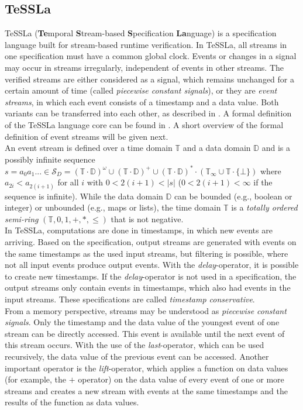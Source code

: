 	\subsection{TeSSLa}
		TeSSLa (\textbf{Te}mporal \textbf{S}tream-based \textbf{S}pecification \textbf{La}nguage) \cite{TeSSLa1} is a specification language built for stream-based runtime verification. In TeSSLa, all streams in one specification must have a common global clock. Events or changes in a signal may occur in streams irregularly, independent of events in other streams. The verified streams are either considered as a signal, which remains unchanged for a certain amount of time (called \textit{piecewise constant signals}), or they are \textit{event streams}, in which each event consists of a timestamp and a data value. Both variants can be transferred into each other, as described in \cite{TeSSLa1}. A formal definition of the TeSSLa language core can be found in \cite{TeSSLa2}. A short overview of the formal definition of event streams will be given next.\\
		An event stream is defined over a time domain $\mathbb{T}$ and a data domain $\mathbb{D}$ and is a possibly infinite sequence $s=a_0a_1...\in\mathcal{S}_D=(\mathbb{T}\cdot\mathbb{D})^\omega\cup(\mathbb{T}\cdot\mathbb{D})^+\cup(\mathbb{T}\cdot\mathbb{D})^*\cdot(\mathbb{T}_\infty\cup\mathbb{T}\cdot\{\bot\})$ where $a_{2i} < a_{2(i+1)}$ for all $i$ with $0 < 2(i + 1) < |s|$ ($0 < 2(i + 1) < \infty$ if the sequence is infinite). While the data domain $\mathbb{D}$ can be bounded (e.g., boolean or integer) or unbounded (e.g., maps or lists), the time domain $\mathbb{T}$ is a \emph{totally ordered semi-ring} $(\mathbb{T}, 0, 1, +, *, \leq)$ that is not negative.\\
		In TeSSLa, computations are done in timestamps, in which new events are arriving. Based on the specification, output streams are generated with events on the same timestamps as the used input streams, but filtering is possible, where not all input events produce output events. With the \textit{delay}-operator, it is possible to create new timestamps. If the \textit{delay}-operator is not used in a specification, the output streams only contain events in timestamps, which also had events in the input streams. These specifications are called \textit{timestamp conservative}.\\
		From a memory perspective, streams may be understood as \textit{piecewise constant signals}. Only the timestamp and the data value of the youngest event of one stream can be directly accessed. This event is available until the next event of this stream occurs. With the use of the \textit{last}-operator, which can be used recursively, the data value of the previous event can be accessed. Another important operator is the \textit{lift}-operator, which applies a function on data values (for example, the $+$ operator) on the data value of every event of one or more streams and creates a new stream with events at the same timestamps and the results of the function as data values.
		
